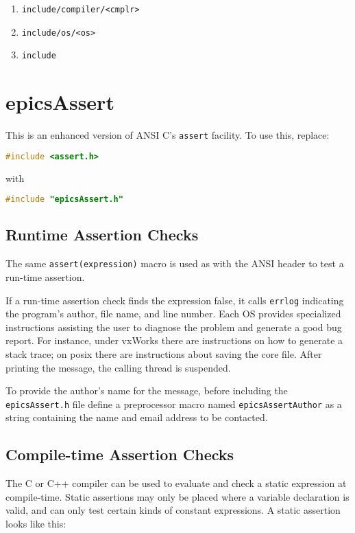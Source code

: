 \begin{enumerate}
\item \verb|include/compiler/<cmplr>|
\item \verb|include/os/<os>|
\item \verb|include|
\end{enumerate}

\section{epicsAssert}

This is an enhanced version of ANSI C's \verb|assert| facility. To use this, replace:

\begin{lstlisting}[language=C]
#include <assert.h>
\end{lstlisting}

with

\begin{lstlisting}[language=C]
#include "epicsAssert.h"
\end{lstlisting}

\subsection{Runtime Assertion Checks}

The same \verb|assert(expression)| macro is used as with the ANSI header to test a run-time assertion.

If a run-time assertion check finds the expression false, it calls \verb|errlog| indicating the program's author, file name, and line number.
Each OS provides specialized instructions assisting the user to diagnose the problem and generate a good bug report.
For instance, under vxWorks there are instructions on how to generate a stack trace; on posix there are instructions about saving the core file.
After printing the message, the calling thread is suspended.

To provide the author's name for the message, before including the \verb|epicsAssert.h| file define a preprocessor macro named \verb|epicsAssertAuthor| as a string containing the name and email address to be contacted.

\subsection{Compile-time Assertion Checks}

The C or C++ compiler can be used to evaluate and check a static expression at compile-time.
Static assertions may only be placed where a variable declaration is valid, and can only test certain kinds of constant expressions.
A static assertion looks like this:

